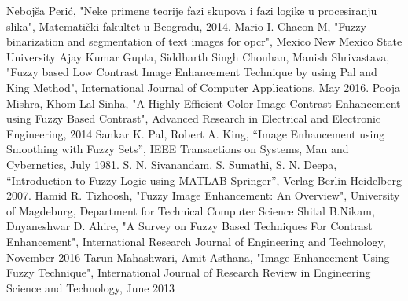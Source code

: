 \documentclass[12pt,a4paper]{article}
\theoremstyle{definition}
\theoremstyle{remark}
\theoremstyle{plain}
\begin{document}
\begin{thebibliography}{9}
  \bibitem{} Neboj\v sa Peri\' c, "Neke primene teorije fazi skupova i fazi logike u procesiranju slika", Matemati\v cki fakultet u Beogradu, 2014.
  \bibitem{} Mario I. Chacon M, "Fuzzy binarization and segmentation of text images for opcr", Mexico New Mexico State University
  \bibitem{} Ajay Kumar Gupta, Siddharth Singh Chouhan, Manish Shrivastava, "Fuzzy based Low Contrast Image Enhancement Technique by using Pal and King Method", International Journal of Computer Applications, May 2016.
  \bibitem{} Pooja Mishra, Khom Lal Sinha, "A Highly Efficient Color Image Contrast Enhancement using Fuzzy Based Contrast", Advanced Research in Electrical and Electronic Engineering, 2014
  \bibitem{} Sankar K. Pal, Robert A. King, “Image Enhancement using Smoothing with Fuzzy Sets”, IEEE Transactions on Systems, Man and Cybernetics, July 1981.
  \bibitem{} S. N. Sivanandam, S. Sumathi, S. N. Deepa, “Introduction to Fuzzy Logic using MATLAB Springer”, Verlag Berlin Heidelberg 2007.
  \bibitem{} Hamid R. Tizhoosh, "Fuzzy Image Enhancement: An Overview", University of Magdeburg, Department for Technical Computer Science
  \bibitem{} Shital B.Nikam, Dnyaneshwar D. Ahire, "A Survey on Fuzzy Based Techniques For Contrast Enhancement", International Research Journal of Engineering and Technology, November 2016
  \bibitem{} Tarun Mahashwari, Amit Asthana, "Image Enhancement Using Fuzzy Technique", International Journal of Research Review in Engineering Science and Technology, June 2013
\end{thebibliography}
\end{document}
